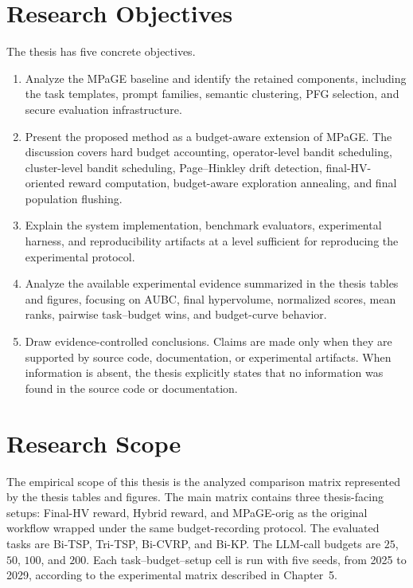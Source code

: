 \section{Research Objectives}

The thesis has five concrete objectives.

\begin{enumerate}
  \item Analyze the MPaGE baseline and identify the retained components, including the task templates, prompt families, semantic clustering, PFG selection, and secure evaluation infrastructure.
  \item Present the proposed \bmab{} method as a budget-aware extension of MPaGE. The discussion covers hard budget accounting, operator-level bandit scheduling, cluster-level bandit scheduling, Page--Hinkley drift detection, final-HV-oriented reward computation, budget-aware exploration annealing, and final population flushing.
  \item Explain the system implementation, benchmark evaluators, experimental harness, and reproducibility artifacts at a level sufficient for reproducing the experimental protocol.
  \item Analyze the available experimental evidence summarized in the thesis tables and figures, focusing on AUBC, final hypervolume, normalized scores, mean ranks, pairwise task--budget wins, and budget-curve behavior.
  \item Draw evidence-controlled conclusions. Claims are made only when they are supported by source code, documentation, or experimental artifacts. When information is absent, the thesis explicitly states that no information was found in the source code or documentation.
\end{enumerate}

\section{Research Scope}

The empirical scope of this thesis is the analyzed comparison matrix represented by the thesis tables and figures. The main matrix contains three thesis-facing setups: Final-HV reward, Hybrid reward, and MPaGE-orig as the original workflow wrapped under the same budget-recording protocol. The evaluated tasks are Bi-TSP, Tri-TSP, Bi-CVRP, and Bi-KP. The LLM-call budgets are $25$, $50$, $100$, and $200$. Each task--budget--setup cell is run with five seeds, from 2025 to 2029, according to the experimental matrix described in Chapter~5.

